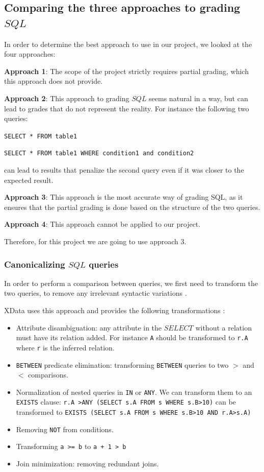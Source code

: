 \subsection{Comparing the three approaches to grading $SQL$}
In order to determine the best approach to use in our project, we looked at
the four approaches:

\textbf{Approach 1}: The scope of the project strictly requires partial grading,
which this approach does not provide.

\textbf{Approach 2}: This approach to grading $SQL$ seems natural in a way, but
can lead to grades that do not represent the reality. For instance the following
two queries:
\begin{center}
    \texttt{SELECT * FROM table1}

    \texttt{SELECT * FROM table1 WHERE condition1 and condition2}
\end{center}
can lead to results that penalize the second query even if it was closer to the
expected result.

\textbf{Approach 3}: This approach is the most accurate way of grading SQL, as
it ensures that the partial grading is done based on the structure of the two
queries.

\textbf{Approach 4}: This approach cannot be applied to our project.

Therefore, for this project we are going to use approach 3.

\subsubsection{Canonicalizing $SQL$ queries}
In order to perform a comparison between queries, we first need to transform the
two queries, to remove any irrelevant syntactic variations
\cite{literature:xdata}.

XData uses this approach and provides the following transformations \cite{literature:xdata}:
\begin{itemize}
    \item Attribute disambiguation: any attribute in the $SELECT$ without a
    relation must have its relation added. For instance \texttt{A} should be
    transformed to \texttt{r.A} where \texttt{r} is the inferred relation.
    \item \texttt{BETWEEN} predicate elimination: transforming \texttt{BETWEEN} queries to
    two $>$ and $<$ comparisons.
    \item Normalization of nested queries in \texttt{IN} or \texttt{ANY}. We
    can transform them to an \texttt{EXISTS} clause:
    \texttt{r.A >ANY (SELECT s.A FROM s WHERE s.B>10)} can be transformed to
    \texttt{EXISTS (SELECT s.A FROM s WHERE s.B>10 AND r.A>s.A)}
    \item Removing \texttt{NOT} from conditions.
    \item Transforming \texttt{a >= b} to \texttt{a + 1 > b}
    \item Join minimization: removing redundant joins.
\end{itemize}

